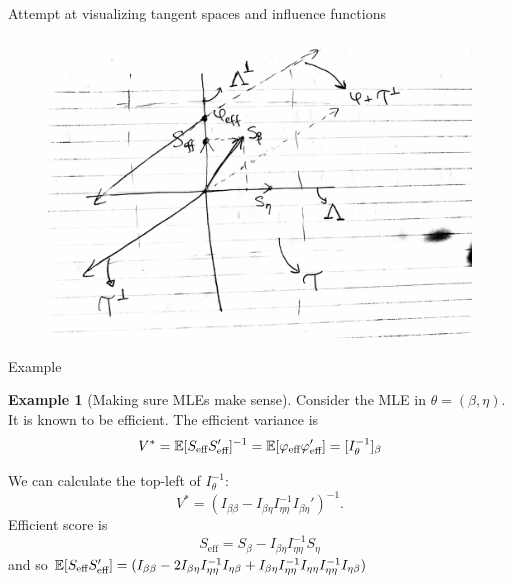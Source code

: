 \documentclass[10pt,aspectratio=169,handout]{beamer}
\theoremstyle{definition}
\newtheorem{ex}{Example}
\begin{document}
\begin{frame}{Attempt at visualizing tangent spaces and influence
functions}
  \begin{figure}[tb]
    \centering
    \includegraphics[height=0.8\textheight]{viz.pdf}
    \label{fig:figure1}
  \end{figure}
\end{frame}


\begin{frame}{Example}
\begin{ex}[Making sure MLEs make sense]
    Consider the MLE in $\theta = (\beta, \eta).$ It is known to be
    efficient. The efficient variance is \[
    V^* = \mathbb{E}[S_\text{eff} S_\text{eff}']^{-1} = \mathbb{E}[\varphi_
    \text{eff}\varphi_\text{eff}'] = [I_\theta^{-1}]_{\beta}
    \]
    
    We can calculate the top-left of $I_\theta^{-1}$: \[
    V^* = (I_{\beta\beta} - I_{\beta\eta}I_{\eta\eta}^{-1} I_{\beta\eta}')^
    {-1}.
    \]
    Efficient score is \[
    S_{\text{eff}}= S_\beta - I_{\beta\eta} I_{\eta\eta}^{-1} S_\eta
    \]
    and so $\mathbb{E}[S_\text{eff} S_\text{eff}'] = (I_{\beta\beta} - 2 I_
    {\beta\eta}I_{\eta\eta}^{-1} I_{\eta\beta} + I_{\beta\eta} I_
    {\eta\eta}^{-1} I_{\eta\eta} I_{\eta\eta}^{-1} I_{\eta\beta})$
  \end{ex} 
\end{frame}
\end{document}
